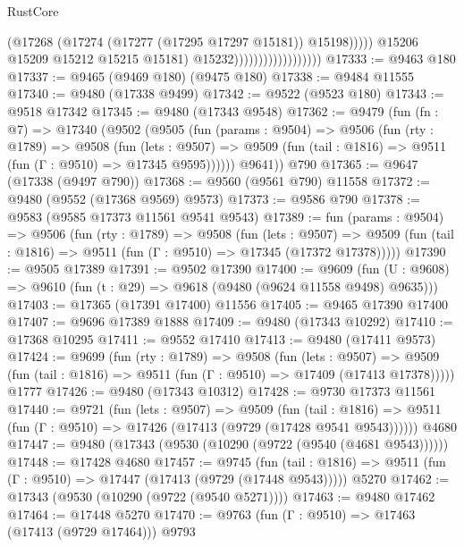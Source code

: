 \begin{lexlean}{RustCore}
\begin{coremodule}
                                                (@17268
                                                  (@17274
                                                    (@17277 (@17295 @17297 @15181))
                                                    @15198)))))
                                          @15206
                                          @15209
                                          @15212
                                          @15215
                                          @15181)
                                        @15232))))))))))))))))))
@17333 := @9463 @180
@17337 := @9465 (@9469 @180) (@9475 @180)
@17338 := @9484 @11555
@17340 := @9480 (@17338 @9499)
@17342 := @9522 (@9523 @180)
@17343 := @9518 @17342
@17345 := @9480 (@17343 @9548)
@17362 := @9479
    (fun (fn : @7) =>
    @17340
      (@9502
        (@9505
          (fun (params : @9504) =>
          @9506
            (fun (rty : @1789) =>
            @9508
              (fun (lets : @9507) =>
              @9509 (fun (tail : @1816) => @9511 (fun (Γ : @9510) => @17345 @9595))))))
        @9641))
    @790
@17365 := @9647 (@17338 (@9497 @790))
@17368 := @9560 (@9561 @790) @11558
@17372 := @9480 (@9552 (@17368 @9569) @9573)
@17373 := @9586 @790
@17378 := @9583 (@9585 @17373 @11561 @9541 @9543)
@17389 := fun (params : @9504) =>
  @9506
    (fun (rty : @1789) =>
    @9508
      (fun (lets : @9507) =>
      @9509 (fun (tail : @1816) => @9511 (fun (Γ : @9510) => @17345 (@17372 @17378)))))
@17390 := @9505 @17389
@17391 := @9502 @17390
@17400 := @9609
    (fun (U : @9608) => @9610 (fun (t : @29) => @9618 (@9480 (@9624 @11558 @9498) @9635)))
@17403 := @17365 (@17391 @17400) @11556
@17405 := @9465 @17390 @17400
@17407 := @9696 @17389 @1888
@17409 := @9480 (@17343 @10292)
@17410 := @17368 @10295
@17411 := @9552 @17410
@17413 := @9480 (@17411 @9573)
@17424 := @9699
    (fun (rty : @1789) =>
    @9508
      (fun (lets : @9507) =>
      @9509 (fun (tail : @1816) => @9511 (fun (Γ : @9510) => @17409 (@17413 @17378)))))
    @1777
@17426 := @9480 (@17343 @10312)
@17428 := @9730 @17373 @11561
@17440 := @9721
    (fun (lets : @9507) =>
    @9509
      (fun (tail : @1816) =>
      @9511 (fun (Γ : @9510) => @17426 (@17413 (@9729 (@17428 @9541 @9543))))))
    @4680
@17447 := @9480 (@17343 (@9530 (@10290 (@9722 (@9540 (@4681 @9543))))))
@17448 := @17428 @4680
@17457 := @9745
    (fun (tail : @1816) => @9511 (fun (Γ : @9510) => @17447 (@17413 (@9729 (@17448 @9543)))))
    @5270
@17462 := @17343 (@9530 (@10290 (@9722 (@9540 @5271))))
@17463 := @9480 @17462
@17464 := @17448 @5270
@17470 := @9763 (fun (Γ : @9510) => @17463 (@17413 (@9729 @17464))) @9793

\end{coremodule}
\end{lexlean}
